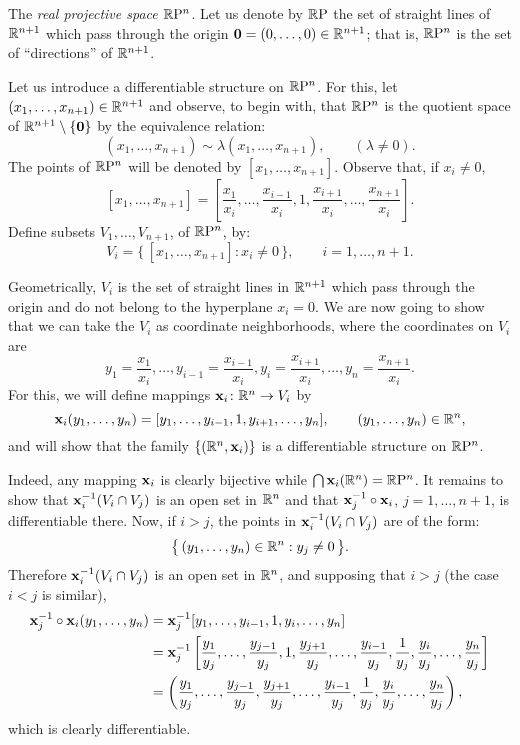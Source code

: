 \begin{example}
  The \emph{real projective space \(\mathbb{R}\mathrm{P}^n\)}. Let us denote by
  \(\mathbb{R}\mathrm{P}\) the set of straight lines of \(\mathbb{R}^{n+1}\) which pass
  through the origin \(\mathbf{0}=(0,\dotsc,0)\in\mathbb{R}^{n+1}\); that is,
  \(\mathbb{R}\mathrm{P}^n\) is the set of ``directions'' of \(\mathbb{R}^{n+1}\).

  Let us introduce a differentiable structure on \(\mathbb{R}\mathrm{P}^n\). For this,
  let \((x_1,\dotsc,x_{n+1})\in\mathbb{R}^{n+1}\) and observe, to begin with,
  that \(\mathbb{R}\mathrm{P}^n\) is the quotient space of
  \(\mathbb{R}^{n+1}\setminus\{\mathbf{0}\}\) by the equivalence relation:
  \[
    (x_1,\dotsc,x_{n+1})\sim\lambda(x_1,\dotsc,x_{n+1}), \qquad
    (\lambda\neq 0).
  \]
  The points of \(\mathbb{R}\mathrm{P}^n\) will be denoted by
  \([x_1,\dotsc,x_{n+1}]\). Observe that, if \(x_i\neq 0\),
  \[
    [x_1,\dotsc,x_{n+1}]=
    \left[\frac{x_1}{x_i},\dotsc,\frac{x_{i-1}}{x_i},1,\frac{x_{i+1}}{x_i},\dotsc,\frac{x_{n+1}}{x_i}\right].
  \]
  Define subsets \(V_1,\dotsc,V_{n+1}\), of \(\mathbb{R}\mathrm{P}^n\), by:
  \[
    V_i=\bigl\{\,[x_1,\dotsc,x_{n+1}]:x_i\neq 0\,\bigr\},\qquad i=1,\dotsc,n+1.
  \]

  Geometrically, \(V_i\) is the set of straight lines in \(\mathbb{R}^{n+1}\)
  which pass through the origin and do not belong to the hyperplane
  \(x_i=0\). We are now going to show that we can take the \(V_i\) as
  coordinate neighborhoods, where the coordinates on \(V_i\) are
  \[
    y_1=\frac{x_1}{x_i},\dotsc,y_{i-1}=\frac{x_{i-1}}{x_i},
    y_i=\frac{x_{i+1}}{x_i},\dotsc,y_n=\frac{x_{n+1}}{x_i}.
  \]
  For this, we will define mappings \(\mathbf{x}_i\colon\mathbb{R}^n\to V_i\) by
  \[
    \mathbf{x}_i(y_1,\dotsc,y_n)=[y_1,\dotsc,y_{i-1},1,y_{i+1},\dotsc,y_n]
    ,\qquad (y_1,\dotsc,y_n)\in\mathbb{R}^n,
  \]
  and will show that the family \(\{(\mathbb{R}^n,\mathbf{x}_i)\}\) is a differentiable
  structure on \(\mathbb{R}\mathrm{P}^n\).

  Indeed, any mapping \(\mathbf{x}_i\) is clearly bijective while
  \(\bigcap\mathbf{x}_i(\mathbb{R}^n)=\mathbb{R}\mathrm{P}^n\). It remains to show that
  \(\mathbf{x}_i^{-1}(V_i\cap V_j)\) is an open set in \(\mathbb{R}^n\) and that
  \(\mathbf{x}_j^{-1}\circ\mathbf{x}_i\), \(j=1,\dotsc,n+1\), is differentiable
  there. Now, if \(i>j\), the points in \(\mathbf{x}_i^{-1}(V_i\cap V_j)\) are of
  the form:
  \[
    \bigl\{\,(y_1,\dotsc,y_n)\in\mathbb{R}^n:y_j\neq 0\,\bigr\}.
  \]
  Therefore \(\mathbf{x}_i^{-1}(V_i\cap V_j)\) is an open set in \(\mathbb{R}^n\), and
  supposing that \(i>j\) (the case \(i<j\) is similar),
  \begin{align*}
    \mathbf{x}_j^{-1}\circ\mathbf{x}_i(y_1,\dotsc,y_n)
    &=\mathbf{x}_j^{-1}[y_1,\dotsc,y_{i-1},1,y_i,\dotsc,y_n]\\
    &=\mathbf{x}_j^{-1}\left[\frac{y_1}{y_j},\dotsc,\frac{y_{j-1}}{y_j},1,
      \frac{y_{j+1}}{y_j},\dotsc,\frac{y_{i-1}}{y_j},\frac{1}{y_j},
      \frac{y_i}{y_j},\dotsc,\frac{y_n}{y_j}\right]\\
    &=\left(\frac{y_1}{y_j},\dotsc,\frac{y_{j-1}}{y_j},\frac{y_{j+1}}{y_j},
      \dotsc,\frac{y_{i-1}}{y_j},\frac{1}{y_j},\frac{y_i}{y_j},\dotsc,
      \frac{y_n}{y_j}\right),
  \end{align*}
  which is clearly differentiable.


\end{example}
